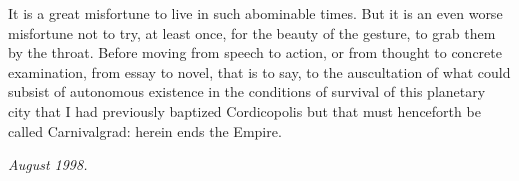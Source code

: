 It is a great misfortune to live in such abominable times. But it is an even worse misfortune not to try, at least once, for the beauty of the gesture, to grab them by the throat. Before moving from speech to action, or from thought to concrete examination, from essay to novel, that is to say, to the auscultation of what could subsist of autonomous existence in the conditions of survival of this planetary city that I had previously baptized Cordicopolis but that must henceforth be called Carnivalgrad: herein ends the Empire.

\begin{flushright}
	\textit{August 1998.}
\end{flushright}